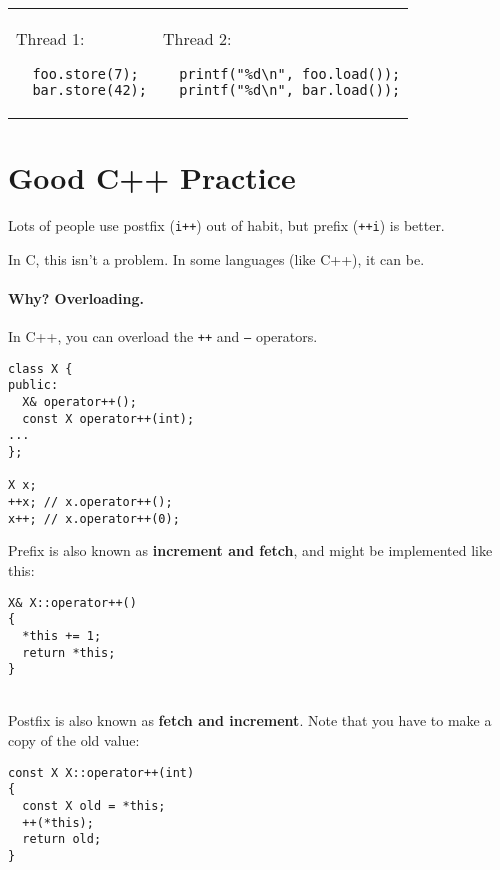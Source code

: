 \documentclass[11pt]{article}
\begin{document}
    \begin{tabular}{ll}
      \begin{minipage}{.25\textwidth}
        Thread 1:
        \begin{lstlisting}
  foo.store(7);
  bar.store(42);
        \end{lstlisting}
      \end{minipage} &
      \begin{minipage}{.45\textwidth}
        Thread 2:
        \begin{lstlisting}
  printf("%d\n", foo.load());
  printf("%d\n", bar.load());
        \end{lstlisting}
      \end{minipage}
    \end{tabular}



\section*{Good C++ Practice}
Lots of people use postfix ({\tt i++}) out of habit, but prefix ({\tt ++i}) is better.

In C, this isn't a problem. 
In some languages (like C++), it can be.

\paragraph{Why? Overloading.} In C++, you can overload the {\tt ++} and {\tt --} operators.

  \begin{lstlisting}
class X {
public:
  X& operator++();
  const X operator++(int);
...
};

X x;
++x; // x.operator++();
x++; // x.operator++(0);
  \end{lstlisting}

Prefix is also known as {\bf increment and fetch}, and might be implemented like this:
  \begin{lstlisting}
X& X::operator++()
{
  *this += 1;
  return *this;
}
  \end{lstlisting}
~\\[1em]

  Postfix is also known as {\bf fetch and increment}. Note that you have to make a copy of
the old value:
  \begin{lstlisting}
const X X::operator++(int)
{
  const X old = *this;
  ++(*this);
  return old;
}
  \end{lstlisting}
\end{document}
